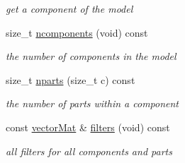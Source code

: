 \begin{DoxyCompactItemize}
\begin{DoxyCompactList}\small\item\em get a component of the model \end{DoxyCompactList}\item 
size\-\_\-t \hyperlink{classParts_a88ecd6a5e7e745e89c53f95f1593c600}{ncomponents} (void) const 
\begin{DoxyCompactList}\small\item\em the number of components in the model \end{DoxyCompactList}\item 
size\-\_\-t \hyperlink{classParts_a77d8b38212220cd8779736205388b48f}{nparts} (size\-\_\-t c) const 
\begin{DoxyCompactList}\small\item\em the number of parts within a component \end{DoxyCompactList}\item 
const \hyperlink{types_8hpp_a3207a7addcfa415d1c83622febcb1e9b}{vector\-Mat} \& \hyperlink{classParts_af3e4755656bcd59221ec3b91a79c0201}{filters} (void) const 
\begin{DoxyCompactList}\small\item\em all filters for all components and parts \end{DoxyCompactList}\end{DoxyCompactItemize}
